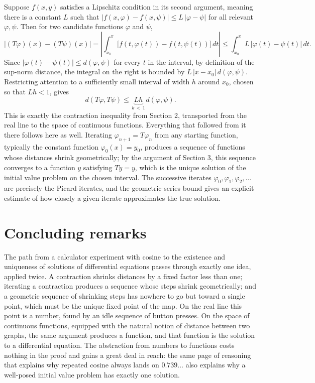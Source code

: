 \documentclass{essay}
\begin{document}
Suppose \(f(x, y)\) satisfies a Lipschitz condition in its second
argument, meaning there is a constant \(L\) such that
\(|f(x, \varphi) - f(x, \psi)| \le L\,|\varphi - \psi|\) for all
relevant \(\varphi, \psi\). Then for two candidate functions \(\varphi\)
and \(\psi\),
\[ |(T\varphi)(x) - (T\psi)(x)| = \left| \int_{x_{0}}^{x} \big[ f(t, \varphi(t)) - f(t, \psi(t)) \big]\, dt \right| \le \int_{x_{0}}^{x} L\, |\varphi(t) - \psi(t)|\, dt. \]
Since \(|\varphi(t) - \psi(t)| \le d(\varphi, \psi)\) for every \(t\) in
the interval, by definition of the sup-norm distance, the integral on
the right is bounded by \(L\,|x - x_{0}|\, d(\varphi, \psi)\). Restricting
attention to a sufficiently small interval of width \(h\) around \(x_{0}\),
chosen so that \(Lh < 1\), gives
\[ d(T\varphi, T\psi) \le \underbrace{Lh}_{\,k \,<\, 1\,} d(\varphi, \psi). \]
This is exactly the contraction inequality from Section 2, transported
from the real line to the space of continuous functions. Everything
that followed from it there follows here as well. Iterating
\(\varphi_{n+1} = T\varphi_{n}\) from any starting function, typically the
constant function \(\varphi_{0}(x) = y_{0}\), produces a sequence of
functions whose distances shrink geometrically; by the argument of
Section 3, this sequence converges to a function \(y\) satisfying
\(Ty = y\), which is the unique solution of the initial value problem
on the chosen interval. The successive iterates \(\varphi_{0}, \varphi_{1},
\varphi_{2}, \ldots\) are precisely the Picard iterates, and the
geometric-series bound gives an explicit estimate of how closely a
given iterate approximates the true solution.

\section{Concluding remarks}

The path from a calculator experiment with cosine to the existence
and uniqueness of solutions of differential equations passes through
exactly one idea, applied twice. A contraction shrinks distances by a
fixed factor less than one; iterating a contraction produces a
sequence whose steps shrink geometrically; and a geometric sequence
of shrinking steps has nowhere to go but toward a single point, which
must be the unique fixed point of the map. On the real line this
point is a number, found by an idle sequence of button presses. On
the space of continuous functions, equipped with the natural notion
of distance between two graphs, the same argument produces a
function, and that function is the solution to a differential
equation. The abstraction from numbers to functions costs nothing in
the proof and gains a great deal in reach: the same page of reasoning
that explains why repeated cosine always lands on \(0.739\ldots\) also
explains why a well-posed initial value problem has exactly one
solution.
\end{document}
